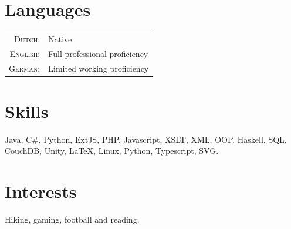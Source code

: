 \documentclass[a4paper,10pt]{article}
\begin{document}
\section{Languages}
\begin{tabular}{rl}
\textsc{Dutch:}& Native\\
\textsc{English:}& Full professional proficiency\\
\textsc{German:}& Limited working proficiency\\
\end{tabular}

\section{Skills}
Java, C\#, Python, ExtJS, PHP, Javascript, XSLT, XML,  OOP,
Haskell, SQL, CouchDB, Unity, LaTeX, Linux, Python, Typescript, SVG.

\section{Interests}
Hiking, gaming, football and reading.
\end{document}
